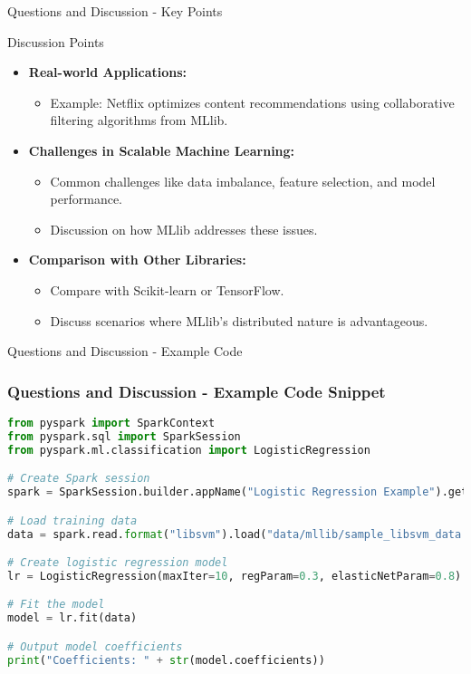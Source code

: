 \documentclass[aspectratio=169]{beamer}
\begin{document}
\begin{frame}[fragile]{Questions and Discussion - Key Points}
    \begin{block}{Discussion Points}
        \begin{itemize}
            \item \textbf{Real-world Applications:} 
                \begin{itemize}
                    \item Example: Netflix optimizes content recommendations using collaborative filtering algorithms from MLlib.
                \end{itemize}
            \item \textbf{Challenges in Scalable Machine Learning:} 
                \begin{itemize}
                    \item Common challenges like data imbalance, feature selection, and model performance.
                    \item Discussion on how MLlib addresses these issues.
                \end{itemize}
            \item \textbf{Comparison with Other Libraries:} 
                \begin{itemize}
                    \item Compare with Scikit-learn or TensorFlow.
                    \item Discuss scenarios where MLlib's distributed nature is advantageous.
                \end{itemize}
        \end{itemize}
    \end{block}
\end{frame}

\begin{frame}[fragile]{Questions and Discussion - Example Code}
    \frametitle{Questions and Discussion - Example Code Snippet}
    \begin{lstlisting}[language=Python]
from pyspark import SparkContext
from pyspark.sql import SparkSession
from pyspark.ml.classification import LogisticRegression

# Create Spark session
spark = SparkSession.builder.appName("Logistic Regression Example").getOrCreate()

# Load training data
data = spark.read.format("libsvm").load("data/mllib/sample_libsvm_data.txt")

# Create logistic regression model
lr = LogisticRegression(maxIter=10, regParam=0.3, elasticNetParam=0.8)

# Fit the model
model = lr.fit(data)

# Output model coefficients
print("Coefficients: " + str(model.coefficients))
    \end{lstlisting}
\end{frame}
\end{document}
